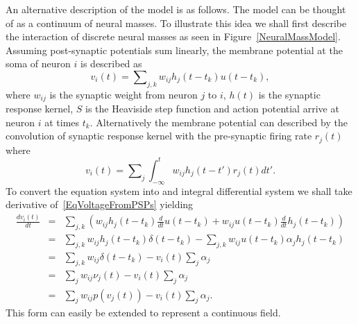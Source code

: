 \documentclass[onecolumn,draftcls]{IEEEtran}
\begin{document}
An alternative description of the model is as follows. The model can be thought of as a continuum of neural masses. To illustrate this idea we shall first describe the interaction of discrete neural masses as seen in Figure~\ref{NeuralMassModel}. Assuming post-synaptic potentials sum linearly, the membrane potential at the soma of neuron $i$ is described as
\begin{equation}\label{VoltageFromPSPs}
{v_i}\left( t \right) = \sum\nolimits_{j,k} {{w_{ij}}{h_{j}}\left( t - {t_k}\right)} u\left( {t - {t_k}} \right),
\end{equation}
where $w_{ij}$ is the synaptic weight from neuron $j$ to $i$, $h(t)$ is the synaptic response kernel, $S$ is the Heaviside step function and action potential arrive at neuron $i$ at times $t_k$. Alternatively the membrane potential can described by the convolution of synaptic response kernel with the pre-synaptic firing rate $r_j(t)$ where
\begin{equation}\label{VoltageFromRate}
{v_i}\left( t \right) = \sum\nolimits_j {\int_{ - \infty }^t {{w_{ij}}{h_j}\left( {t - t'} \right){r_j}\left( t \right)} } dt'.
\end{equation}
To convert the equation system into and integral differential system we shall take derivative of~\ref{EqVoltageFromPSPs} yielding
\begin{eqnarray}
  \frac{{d{v_i}\left( t \right)}}{{dt}} &=& \sum\nolimits_{j,k} {\left( {{w_{ij}}{h_j}\left( t- {t_k} \right)\frac{d}{{dt}}u\left( {t - {t_k}} \right) + {w_{ij}}u\left( {t - {t_k}} \right)\frac{d}{{dt}}{h_j}\left( t- {t_k} \right)} \right)} \nonumber \\
   &=& \sum\nolimits_{j,k} {{w_{ij}}{h_j}\left( t- {t_k} \right)\delta \left( {t - {t_k}} \right)}  - \sum\nolimits_{j,k} {{w_{ij}}u\left( {t - {t_k}} \right)\alpha_j{h_j}\left( t- {t_k} \right)}   \nonumber \\
   &=& \sum\nolimits_{j,k} {{w_{ij}}\delta \left( {t - {t_k}} \right)}  - {v_i}\left( t \right)\sum\nolimits_j {\alpha_j} \nonumber  \\
   &=& \sum\nolimits_j {{w_{ij}}{\nu_j}\left( t \right)}  - {v_i}\left( t \right)\sum\nolimits_j {\alpha_j} \nonumber \\
   &=& \sum\nolimits_j {{w_{ij}}p\left( {{v_j}\left( t \right)} \right)}  - {v_i}\left( t \right)\sum\nolimits_j {\alpha_j}.
\end{eqnarray}
This form can easily be extended to represent a continuous field.
\end{document}
